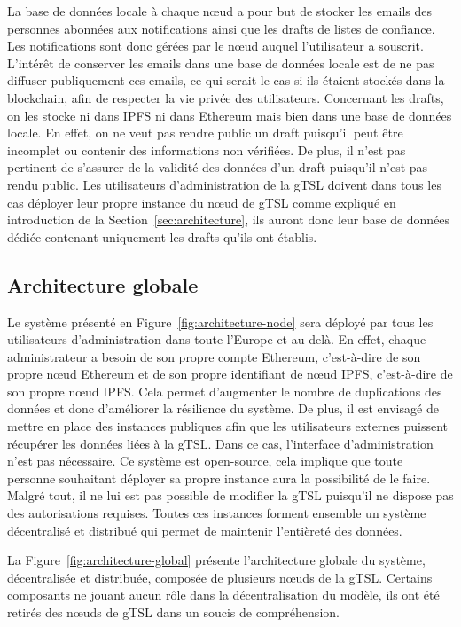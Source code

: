 \documentclass{tnreport}
\begin{document}
La base de données locale à chaque nœud a pour but de stocker les emails des personnes abonnées aux notifications ainsi que les drafts de listes de confiance. Les notifications sont donc gérées par le nœud auquel l'utilisateur a souscrit. L'intérêt de conserver les emails dans une base de données locale est de ne pas diffuser publiquement ces emails, ce qui serait le cas si ils étaient stockés dans la blockchain, afin de respecter la vie privée des utilisateurs. Concernant les drafts, on les stocke ni dans IPFS ni dans Ethereum mais bien dans une base de données locale. En effet, on ne veut pas rendre public un draft puisqu'il peut être incomplet ou contenir des informations non vérifiées. De plus, il n'est pas pertinent de s'assurer de la validité des données d'un draft puisqu'il n'est pas rendu public. Les utilisateurs d'administration de la gTSL doivent dans tous les cas déployer leur propre instance du nœud de gTSL comme expliqué en introduction de la Section~\ref{sec:architecture}, ils auront donc leur base de données dédiée contenant uniquement les drafts qu'ils ont établis.

\subsection{Architecture globale}

Le système présenté en Figure~\ref{fig:architecture-node} sera déployé par tous les utilisateurs d'administration dans toute l'Europe et au-delà. En effet, chaque administrateur a besoin de son propre compte Ethereum, c'est-à-dire de son propre nœud Ethereum et de son propre identifiant de nœud IPFS, c'est-à-dire de son propre nœud IPFS. Cela permet d'augmenter le nombre de duplications des données et donc d'améliorer la résilience du système. De plus, il est envisagé de mettre en place des instances publiques afin que les utilisateurs externes puissent récupérer les données liées à la gTSL. Dans ce cas, l'interface d'administration n'est pas nécessaire. Ce système est open-source, cela implique que toute personne souhaitant déployer sa propre instance aura la possibilité de le faire. Malgré tout, il ne lui est pas possible de modifier la gTSL puisqu'il ne dispose pas des autorisations requises. Toutes ces instances forment ensemble un système décentralisé et distribué qui permet de maintenir l'entièreté des données. 

La Figure~\ref{fig:architecture-global} présente l'architecture globale du système, décentralisée et distribuée, composée de plusieurs nœuds de la gTSL. Certains composants ne jouant aucun rôle dans la décentralisation du modèle, ils ont été retirés des nœuds de gTSL dans un soucis de compréhension.
\clearpage
\end{document}
